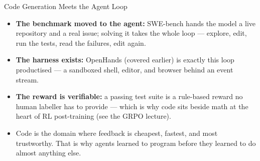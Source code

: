 \begin{frame}{Code Generation Meets the Agent Loop}
  \begin{itemize}\itemsep0.5em
    \item[\textcolor{red}{$\triangleright$}] \textbf{The benchmark moved to the agent:} SWE-bench hands the
      model a live repository and a real issue; solving it takes the whole loop --- explore, edit, run the
      tests, read the failures, edit again.
    \item[\textcolor{red}{$\triangleright$}] \textbf{The harness exists:} OpenHands (covered earlier) is
      exactly this loop productised --- a sandboxed shell, editor, and browser behind an event stream.
    \item[\textcolor{red}{$\triangleright$}] \textbf{The reward is verifiable:} a passing test suite is a
      rule-based reward no human labeller has to provide --- which is why code sits beside math at the heart
      of RL post-training (see the GRPO lecture).
    \item[\textcolor{red}{$\triangleright$}] Code is the domain where feedback is cheapest, fastest, and
      most trustworthy. That is why agents learned to program before they learned to do almost anything
      else.
  \end{itemize}
\end{frame}
